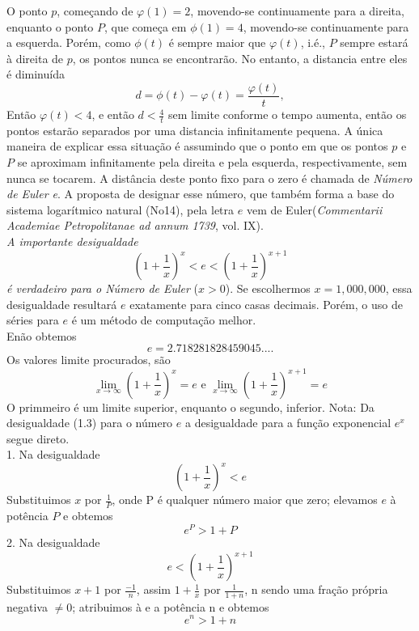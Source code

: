 O ponto $p$, começando de $\varphi(1)=2$, movendo-se continuamente para a direita, enquanto o ponto $P$, que começa em $\phi(1)=4$, movendo-se continuamente para a esquerda.
Porém, como $\phi(t)$ é sempre maior que $\varphi(t)$, i.é., $P$ sempre estará à direita de $p$, os pontos nunca se encontrarão. No entanto, a distancia entre eles é diminuída
$$d=\phi(t) - \varphi(t) = \frac{\varphi(t)}{t},$$
 Então $\varphi(t) < 4$, e então $d < \frac{4}{t}$ sem limite conforme o tempo aumenta, então os pontos estarão separados por uma distancia infinitamente pequena.
 A única maneira de explicar essa situação é assumindo que o ponto em que os pontos $p$ e $P$ se aproximam infinitamente  pela direita e pela esquerda, respectivamente, sem nunca se tocarem.
 A distância deste ponto fixo para o zero é chamada de \textit{Número de Euler e}.
A proposta de designar esse número, que também forma a base do sistema logarítmico natural (No14), pela letra $e$ vem de Euler(\textit{Commentarii Academiae Petropolitanae ad annum 1739}, vol. IX).\\
\textit{A importante desigualdade}
\begin{equation}
\left(1 + \frac{1}{x}\right)^{x} < e < \left(1 + \frac{1}{x}\right)^{x+1} 
\end{equation}
\textit{é verdadeiro para o Número de Euler} ($x > 0$).
Se escolhermos $x = 1,000,000$, essa desigualdade resultará $e$ exatamente para cinco casas decimais. Porém, o uso de séries para $e$ é um método de computação melhor.\\
Enão obtemos
$$e = 2.718281828459045... .$$
Os valores limite procurados, são
$$\lim_{x\rightarrow \infty} \left( 1 + \frac{1}{x}\right)^{x} = e \textrm{  e  } \lim_{x\rightarrow \infty} \left( 1 + \frac{1}{x}\right)^{x+1} = e$$
O primmeiro é um limite superior, enquanto o segundo, inferior.
Nota: Da desigualdade (1.3) para o número $e$ a desigualdade para a função exponencial $e^{x}$ segue direto.\\
1. Na desigualdade
$$\left(1 + \frac{1}{x}\right)^{x} < e$$
Substituimos $x$ por $\frac{1}{P}$, onde P é qualquer número maior que zero; elevamos $e$ à potência $P$ e obtemos
\begin{equation}
e^{P} > 1 + P
\end{equation}
2. Na desigualdade
$$e < \left(1 + \frac{1}{x}\right)^{x + 1}$$
Substituimos $x+1$ por $\frac{-1}{n}$, assim $1 + \frac{1}{x}$ por $\frac{1}{1+n}$, n sendo uma fração própria negativa $\neq 0$; atribuimos à e a potência n e obtemos
\begin{equation}
e^{n} > 1 + n
\end{equation}
